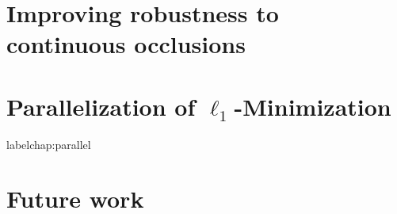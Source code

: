 \documentclass[draftthesis,tocnosub,noragright,centerchapter,12pt]{uiucecethesis09}
\begin{document}
\chapter{Improving robustness to continuous occlusions}
\label{chap:iccv}
%

\chapter{Parallelization of $\ell_1$-Minimization}
label{chap:parallel}


\chapter{Future work}
\label{chap:future}
%

\appendix 
%

\backmatter



\end{document}
